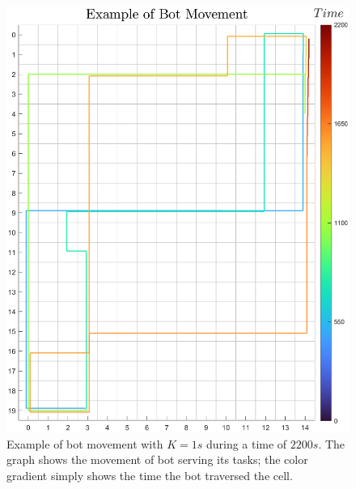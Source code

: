 \documentclass[10pt,a4paper]{article}
\begin{document}
				\begin{figure}[H]
					\centering
					\includegraphics[scale = 0.55]{Images/BotMovement}
					\caption{Example of bot movement with $K=1s$ during a time of $2200s$. The graph shows the movement of bot serving its tasks; the color gradient simply shows the time the bot traversed the cell.}
				\end{figure}
\end{document}
